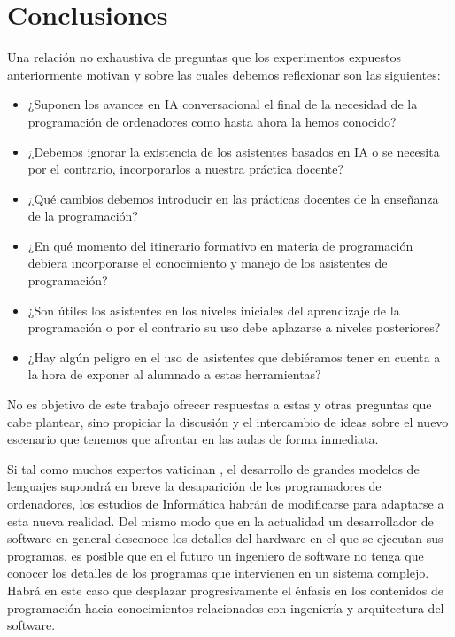 \documentclass[twocolumn,twoside,a4paper, 10pt]{article}
\begin{document}
\section{Conclusiones}
Una relación no exhaustiva de preguntas que los experimentos expuestos anteriormente motivan y sobre las cuales 
debemos reflexionar son las siguientes:
\begin{itemize} 
\item ¿Suponen los avances en IA conversacional el final de la necesidad de la programación de ordenadores como hasta ahora
  la hemos conocido?
\item ¿Debemos ignorar la existencia de los asistentes basados en IA o se necesita por el contrario, incorporarlos a
    nuestra práctica docente?
\item ¿Qué cambios debemos introducir en las prácticas docentes de la enseñanza de la programación?
\item ¿En qué momento del itinerario formativo en materia de programación debiera incorporarse el conocimiento
  y manejo de los asistentes de programación?
\item ¿Son útiles los asistentes en los niveles iniciales del aprendizaje de la programación o por el
  contrario su uso debe aplazarse a niveles posteriores?
\item ¿Hay algún peligro en el uso de asistentes que debiéramos tener en cuenta a la hora de exponer al
  alumnado a estas herramientas?
\end {itemize} 

No es objetivo de este trabajo ofrecer respuestas a estas y otras preguntas que cabe plantear, sino propiciar
la discusión y el intercambio de ideas sobre el nuevo escenario que tenemos que afrontar en las aulas de forma
inmediata.

Si tal como muchos expertos vaticinan 
\cite{Welsh:2023:TEoP}, 
el desarrollo de grandes modelos de lenguajes supondrá en breve la desaparición de los programadores de
ordenadores, los estudios de Informática habrán de modificarse para adaptarse a esta nueva realidad. 
Del mismo modo que en la actualidad un desarrollador de software en general desconoce los detalles del
hardware en el que se ejecutan sus programas, es posible que en el futuro un ingeniero de software no
tenga que conocer los detalles de los programas que intervienen en un sistema complejo.
Habrá en este caso que desplazar progresivamente el énfasis en los contenidos de programación hacia conocimientos 
relacionados con ingeniería y arquitectura del software.
\end{document}
